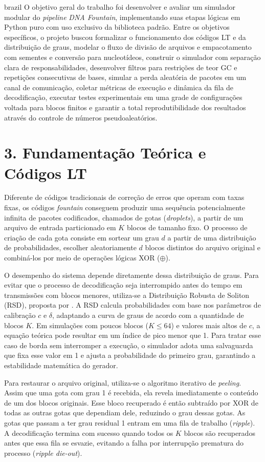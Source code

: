 \begin{resumo}
\begin{otherlanguage*}{brazil}
O objetivo geral do trabalho foi desenvolver e avaliar um simulador modular do \emph{pipeline} \emph{DNA Fountain}, implementando suas etapas lógicas em Python puro com uso exclusivo da biblioteca padrão. Entre os objetivos específicos, o projeto buscou formalizar o funcionamento dos códigos LT e da distribuição de graus, modelar o fluxo de divisão de arquivos e empacotamento com sementes e conversão para nucleotídeos, construir o simulador com separação clara de responsabilidades, desenvolver filtros para restrições de teor GC e repetições consecutivas de bases, simular a perda aleatória de pacotes em um canal de comunicação, coletar métricas de execução e dinâmica da fila de decodificação, executar testes experimentais em uma grade de configurações voltada para blocos finitos e garantir a total reprodutibilidade dos resultados através do controle de números pseudoaleatórios.

\section*{3. Fundamentação Teórica e Códigos LT}

Diferente de códigos tradicionais de correção de erros que operam com taxas fixas, os códigos \emph{fountain} conseguem produzir uma sequência potencialmente infinita de pacotes codificados, chamados de gotas (\emph{droplets}), a partir de um arquivo de entrada particionado em $K$ blocos de tamanho fixo. O processo de criação de cada gota consiste em sortear um grau $d$ a partir de uma distribuição de probabilidades, escolher aleatoriamente $d$ blocos distintos do arquivo original e combiná-los por meio de operações lógicas XOR ($\oplus$).

O desempenho do sistema depende diretamente dessa distribuição de graus. Para evitar que o processo de decodificação seja interrompido antes do tempo em transmissões com blocos menores, utiliza-se a Distribuição Robusta de Soliton (RSD), proposta por . A RSD calcula probabilidades com base nos parâmetros de calibração $c$ e $\delta$, adaptando a curva de graus de acordo com a quantidade de blocos $K$. Em simulações com poucos blocos ($K \le 64$) e valores mais altos de $c$, a equação teórica pode resultar em um índice de pico menor que 1. Para tratar esse caso de borda sem interromper a execução, o simulador adota uma salvaguarda que fixa esse valor em 1 e ajusta a probabilidade do primeiro grau, garantindo a estabilidade matemática do gerador.

Para restaurar o arquivo original, utiliza-se o algoritmo iterativo de \emph{peeling}. Assim que uma gota com grau 1 é recebida, ela revela imediatamente o conteúdo de um dos blocos originais. Esse bloco recuperado é então subtraído por XOR de todas as outras gotas que dependiam dele, reduzindo o grau dessas gotas. As gotas que passam a ter grau residual 1 entram em uma fila de trabalho (\emph{ripple}). A decodificação termina com sucesso quando todos os $K$ blocos são recuperados antes que essa fila se esvazie, evitando a falha por interrupção prematura do processo (\emph{ripple die-out}).


\end{otherlanguage*}
\end{resumo}
